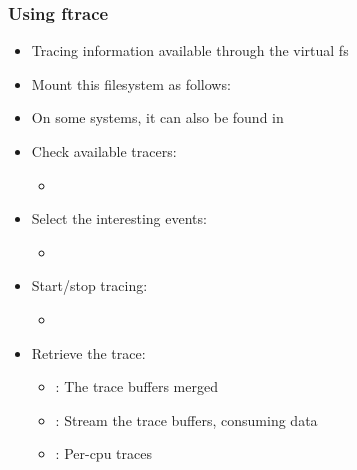 \begin{frame}
  \frametitle{Using ftrace}
  \begin{itemize}
  \item Tracing information available through the  virtual fs
  \item Mount this filesystem as follows:\\
  \item On some systems, it can also be found in 
  \item Check available tracers:
	  \begin{itemize}
		  \item {}
	  \end{itemize}
  \item Select the interesting events:
	  \begin{itemize}
		  \item {}
	  \end{itemize}
  \item Start/stop tracing:
	  \begin{itemize}
		  \item {}
	  \end{itemize}
  \item Retrieve the trace:
	  \begin{itemize}
		  \item {}: The trace buffers merged
		  \item {}: Stream the trace buffers, consuming data
		  \item {}: Per-cpu traces
	  \end{itemize}
  \end{itemize}
\end{frame}

